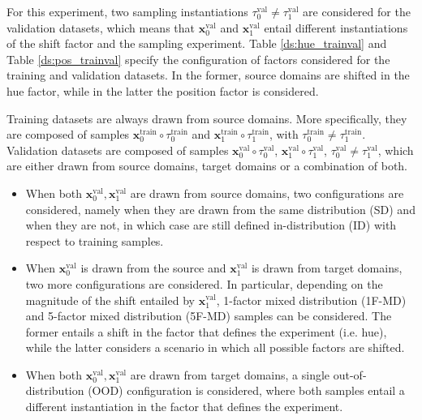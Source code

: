 For this experiment, two sampling instantiations $\tau_0^{\text{val}} \neq \tau_1^{\text{val}}$ 
are considered for the validation datasets, which means that $\bm{x}_0^{\text{val}}$ and $\bm{x}_1^{\text{val}}$ 
entail different instantiations of the shift factor and the sampling experiment. 
Table \ref{ds:hue_trainval} and Table \ref{ds:pos_trainval} specify 
the configuration of factors considered for the training and validation datasets. In the former,
source domains are shifted in the hue factor, while in the latter the position factor is considered.

\begin{dataset}
    Training datasets are always drawn from source domains. More specifically, they are composed of samples 
    $\bm{x}_0^{\text{train}} \circ \tau_0^{\text{train}}$ and $\bm{x}_1^{\text{train}} \circ \tau_1^{\text{train}}$, 
    with $\tau_0^{\text{train}} \neq \tau_1^{\text{train}}$. Validation datasets are composed of samples
    $\bm{x}_0^{\text{val}} \circ \tau_0^{\text{val}}$, $\bm{x}_1^{\text{val}} \circ \tau_1^{\text{val}}$,
    $\tau_0^{\text{val}} \neq \tau_1^{\text{val}}$, which are either drawn from source domains, target domains or a combination of both.

    \begin{itemize}
        \item When both $\bm{x}_0^{\text{val}}, \bm{x}_1^{\text{val}}$ are drawn from source domains, 
        two configurations are considered, namely when they are drawn from the same distribution (SD) and when 
        they are not, in which case are still defined in-distribution (ID) with respect to training samples.
        \item When $\bm{x}_0^{\text{val}}$ is drawn from the source and $\bm{x}_1^{\text{val}}$ is drawn
        from target domains, two more configurations are considered. In particular, depending on the magnitude of the 
        shift entailed by $\bm{x}_1^{\text{val}}$, 1-factor mixed distribution (1F-MD) and 5-factor mixed 
        distribution (5F-MD) samples can be considered. The former entails a shift in the factor that defines the
        experiment (i.e. hue), while the latter considers a scenario in which all possible factors are shifted.
        \item When both $\bm{x}_0^{\text{val}}, \bm{x}_1^{\text{val}}$ are drawn from target domains, 
        a single out-of-distribution (OOD) configuration is considered, where both samples entail a different
        instantiation in the factor that defines the experiment.
    \end{itemize}


\end{dataset}

